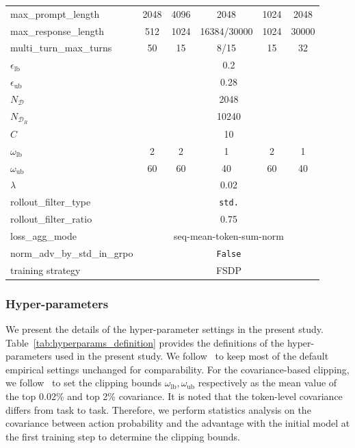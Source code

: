 \documentclass[]{youtu} %
\begin{document}
\begin{table}[htbp]
{{{\begin{tabular}{lccccc}
max\_prompt\_length &  2048  &  4096 & 2048   &  1024  & 2048 \\
max\_response\_length &  512 & 1024 &  16384/30000 & 1024 & 30000 \\
multi\_turn\_max\_turns &   50 & 15 & 8{/15} & 15  & 32 \\
$\epsilon_{\text{lb}}$  &  \multicolumn{5}{c}{0.2} \\
$\epsilon_{\text{ub}}$ &\multicolumn{5}{c}{0.28}  \\
$N_{\mathcal{D}}$ & \multicolumn{5}{c}{2048} \\
$N_{\mathcal{D}_R}$ & \multicolumn{5}{c}{10240} \\
$C$ & \multicolumn{5}{c}{10}  \\
$\omega_{\text{lb}}$  &  2 & 2 & 1  &  2 & 1  \\
$\omega_{\text{ub}}$ & 60 & 60 & 40 & 60  & 40  \\
$\lambda$ & \multicolumn{5}{c}{0.02} \\
rollout\_filter\_type &  \multicolumn{5}{c}{\texttt{std.}} \\
rollout\_filter\_ratio & \multicolumn{5}{c}{0.75} \\
loss\_agg\_mode  &  \multicolumn{5}{c}{seq-mean-token-sum-norm}  \\
norm\_adv\_by\_std\_in\_grpo &  \multicolumn{5}{c}{\texttt{False}}  \\
training strategy  &  \multicolumn{5}{c}{FSDP} \\
\bottomrule
\end{tabular}
}}}
\end{table}






\subsubsection{Hyper-parameters}

We present the details of the hyper-parameter settings in the present study.
Table~\ref{tab:hyperparams_definition} provides the definitions of the hyper-parameters used in the present study.
We follow~\cite{sheng2024hybridflow} to keep most of the default empirical settings unchanged for comparability.
For the covariance-based clipping,
we follow~\cite{cui2025entropy} to set the clipping bounds $\omega_{\text{lb}},\omega_{\text{ub}}$ respectively as the mean value of the top 0.02\% and top 2\% covariance.
It is noted that the token-level covariance differs from task to task.
Therefore,
we perform statistics analysis on the covariance between action probability and the advantage with the initial model at the first training step to determine the clipping bounds.
\end{document}
